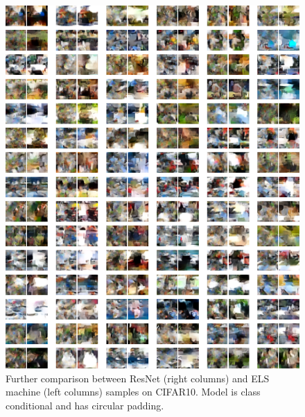 \documentclass{article}
\theoremstyle{plain}
\theoremstyle{definition}
\theoremstyle{remark}
\begin{document}
\begin{figure}
    \centering
    \includegraphics[width=0.9\linewidth]{cifar10_circular_samps_resnet_multiscale.png}
    \caption{Further comparison between ResNet (right columns) and ELS machine (left columns) samples on CIFAR10. Model is class conditional and has circular padding.}
    \label{fig:cifar10-circular-resnet}
\end{figure}
\end{document}
